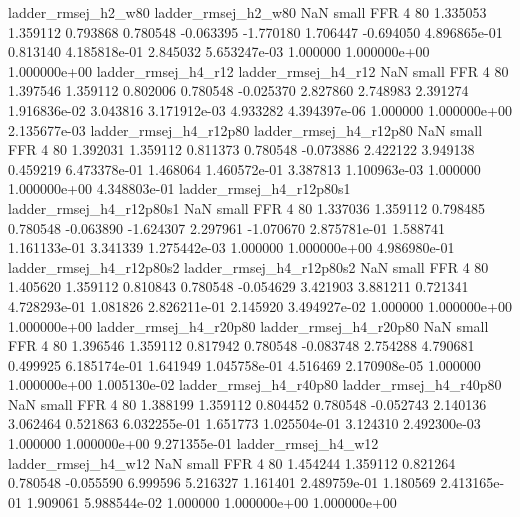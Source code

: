      ladder_rmsej_h2_w80      ladder_rmsej_h2_w80                   NaN      small      FFR                 4 80 1.335053       1.359112 0.793868       0.780548   -0.063395     -1.770180      1.706447    -0.694050   4.896865e-01  0.813140 4.185818e-01     2.845032   5.653247e-03            1.000000    1.000000e+00        1.000000e+00
     ladder_rmsej_h4_r12      ladder_rmsej_h4_r12                   NaN      small      FFR                 4 80 1.397546       1.359112 0.802006       0.780548   -0.025370      2.827860      2.748983     2.391274   1.916836e-02  3.043816 3.171912e-03     4.933282   4.394397e-06            1.000000    1.000000e+00        2.135677e-03
  ladder_rmsej_h4_r12p80   ladder_rmsej_h4_r12p80                   NaN      small      FFR                 4 80 1.392031       1.359112 0.811373       0.780548   -0.073886      2.422122      3.949138     0.459219   6.473378e-01  1.468064 1.460572e-01     3.387813   1.100963e-03            1.000000    1.000000e+00        4.348803e-01
ladder_rmsej_h4_r12p80s1 ladder_rmsej_h4_r12p80s1                   NaN      small      FFR                 4 80 1.337036       1.359112 0.798485       0.780548   -0.063890     -1.624307      2.297961    -1.070670   2.875781e-01  1.588741 1.161133e-01     3.341339   1.275442e-03            1.000000    1.000000e+00        4.986980e-01
ladder_rmsej_h4_r12p80s2 ladder_rmsej_h4_r12p80s2                   NaN      small      FFR                 4 80 1.405620       1.359112 0.810843       0.780548   -0.054629      3.421903      3.881211     0.721341   4.728293e-01  1.081826 2.826211e-01     2.145920   3.494927e-02            1.000000    1.000000e+00        1.000000e+00
  ladder_rmsej_h4_r20p80   ladder_rmsej_h4_r20p80                   NaN      small      FFR                 4 80 1.396546       1.359112 0.817942       0.780548   -0.083748      2.754288      4.790681     0.499925   6.185174e-01  1.641949 1.045758e-01     4.516469   2.170908e-05            1.000000    1.000000e+00        1.005130e-02
  ladder_rmsej_h4_r40p80   ladder_rmsej_h4_r40p80                   NaN      small      FFR                 4 80 1.388199       1.359112 0.804452       0.780548   -0.052743      2.140136      3.062464     0.521863   6.032255e-01  1.651773 1.025504e-01     3.124310   2.492300e-03            1.000000    1.000000e+00        9.271355e-01
     ladder_rmsej_h4_w12      ladder_rmsej_h4_w12                   NaN      small      FFR                 4 80 1.454244       1.359112 0.821264       0.780548   -0.055590      6.999596      5.216327     1.161401   2.489759e-01  1.180569 2.413165e-01     1.909061   5.988544e-02            1.000000    1.000000e+00        1.000000e+00
